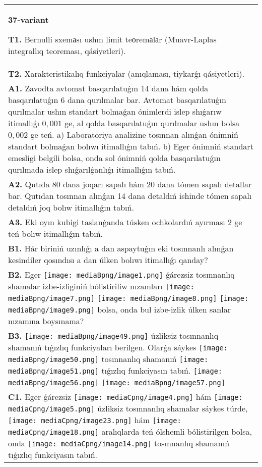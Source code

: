 \documentclass{article}
\begin{document}
\begin{tabular}{m{17cm}}
\textbf{37-variant}
\newline

\textbf{T1.} Bernulli sxemаsı ushın limit teоremаlаr (Muavr-Laplas integrallıq teoreması, qásiyetleri).
 \\
\textbf{T2.} Xarakteristikalıq funkciyalar (anıqlaması, tiykarǵı qásiyetleri).
 \\
\textbf{A1.} Zavodta avtomat basqarılatuǵın 14 dana hám qolda basqarılatuǵın 6 dana qurılmalar bar. Avtomat basqarılatuǵın qurılmalar ushın standart bolmaǵan ónimlerdi islep shıǵarıw itimallıǵı $0,001$ ge, al qolda basqarılatuǵın qurılmalar ushın bolsa $0,002$ ge teń. a) Laboratoriya analizine tosınnan alınǵan ónimniń standart bolmaǵan bolıwı itimallıǵın tabıń. b) Eger ónimniń standart emesligi belgili bolsa, onda sol ónimniń qolda basqarılatuǵın qurılmada islep shıǵarılǵanlıǵı itimallıǵın tabıń.
 \\
\textbf{A2.} Qutıda 80 dana joqarı sapalı hám 20 dana tómen sapalı detallar bar. Qutıdan tosınnan alınǵan 14 dana detaldıń ishinde tómen sapalı detaldıń joq bolıw itimallıǵın tabıń.
 \\
\textbf{A3.} Eki oyın kubigi taslanǵanda túsken ochkolardıń ayırması 2 ge teń bolıw itimallıǵın tabıń.
 \\
\textbf{B1.} Hár biriniń uzınlıǵı a dan aspaytuǵın eki tosınnanlı alınǵan kesindiler qosındısı a dan úlken bolıwı itimallıǵı qanday?
 \\
\textbf{B2.} Eger \texttt{[image: mediaBpng/image1.png]} ǵárezsiz tosınnanlıq shamalar izbe-izliginiń bólistiriliw nızamları
\texttt{[image: mediaBpng/image7.png]} \texttt{[image: mediaBpng/image8.png]} \texttt{[image: mediaBpng/image9.png]}
bolsa, onda bul izbe-izlik úlken sanlar nızamına boysınama?
 \\
\textbf{B3.} \texttt{[image: mediaBpng/image49.png]} úzliksiz tosınnanlıq shamanıń tıǵızlıq funkciyaları berilgen. Olarǵa sáykes \texttt{[image: mediaBpng/image50.png]} tosınnanlıq shamanıń \texttt{[image: mediaBpng/image51.png]} tıǵızlıq funkciyasın tabıń. \texttt{[image: mediaBpng/image56.png]} \texttt{[image: mediaBpng/image57.png]}
 \\
\textbf{C1.} Eger ǵárezsiz \texttt{[image: mediaCpng/image4.png]} hám \texttt{[image: mediaCpng/image5.png]} úzliksiz tosınnanlıq shamalar sáykes túrde, \texttt{[image: mediaCpng/image23.png]} hám \texttt{[image: mediaCpng/image18.png]} aralıqlarda teń ólshemli bólistirilgen bolsa, onda \texttt{[image: mediaCpng/image14.png]} tosınnanlıq shamanıń tıǵızlıq funkciyasın tabıń.

\end{tabular}
\end{document}
